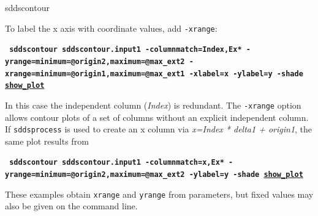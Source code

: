 \begin{sddsprog}{sddscontour}
\begin{itemize}
        To label the x axis with coordinate values, add \verb|-xrange|:
        \begin{flushleft}{\tt \bf
            sddscontour sddscontour.input1 -columnmatch=Index,Ex* -yrange=minimum=@origin2,maximum=@max\_ext2 -xrange=minimum=@origin1,maximum=@max\_ext1 -xlabel=x -ylabel=y -shade \href{https://ops.aps.anl.gov/manuals/example_files/sddscontour4_img.html}{show\_plot}
        }\end{flushleft}

        In this case the independent column ({\em Index}) is redundant.  The \verb|-xrange| option allows contour plots of a set
        of columns without an explicit independent column.  If \verb|sddsprocess| is used to create an x column via
        {\em x=Index * delta1 + origin1}, the same plot results from
        \begin{flushleft}{\tt \bf
            sddscontour sddscontour.input1 -columnmatch=x,Ex* -yrange=minimum=@origin2,maximum=@max\_ext2 -ylabel=y -shade \href{https://ops.aps.anl.gov/manuals/example_files/sddscontour5_img.html}{show\_plot}
        }\end{flushleft}

        These examples obtain \verb|xrange| and \verb|yrange| from parameters, but fixed values may also be given on the command line.



\end{itemize}
\end{sddsprog}
